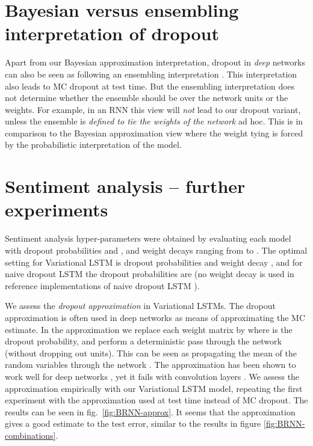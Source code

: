\documentclass{article}
\theoremstyle{definition}
\begin{document}
{
\small
\setlength{\bibsep}{3pt plus 0.3ex}
\renewcommand{\baselinestretch}{0.98}


}
\renewcommand{\baselinestretch}{1}


\newpage
\appendix
\setlength{\belowcaptionskip}{-5pt}

\section{Bayesian versus ensembling interpretation of dropout}\label{sec:interp}

Apart from our Bayesian approximation interpretation, dropout in \textit{deep} networks can also be seen as following an ensembling interpretation \citep{srivastava2014dropout}. 
This interpretation also leads to MC dropout at test time.
But the ensembling interpretation does not determine whether the ensemble should be over the network units or the weights. 
For example, in an RNN this view will \textit{not} lead to our dropout variant, unless the ensemble is \textit{defined to tie the weights of the network} ad hoc.
This is in comparison to the Bayesian approximation view where the weight tying is forced by the probabilistic interpretation of the model.


\section{Sentiment analysis -- further experiments}\label{sec:exps}


Sentiment analysis hyper-parameters were obtained by evaluating each model with dropout probabilities  and , and weight decays ranging from  to .
The optimal setting for Variational LSTM is dropout probabilities  and weight decay , and for naive dropout LSTM the dropout probabilities are  (no weight decay is used in reference implementations of naive dropout LSTM \citep{zaremba2014recurrent}). 



We assess the \textit{dropout approximation} in Variational LSTMs. The dropout approximation is often used in deep networks as means of approximating the MC estimate. In the approximation we replace each weight matrix  by  where  is the dropout probability, and perform a deterministic pass through the network (without dropping out units). This can be seen as propagating the mean of the random variables  through the network \citep{Gal2015DropoutB}. The approximation has been shown to work well for deep networks \cite{srivastava2014dropout}, yet it fails with convolution layers \citep{Gal2015Bayesian}. We assess the approximation empirically with our Variational LSTM model, repeating the first experiment with the approximation used at test time instead of MC dropout. The results can be seen in fig.\ \ref{fig:BRNN-approx}. It seems that the approximation gives a good estimate to the test error, similar to the results in figure \ref{fig:BRNN-combinations}. 
\end{document}
